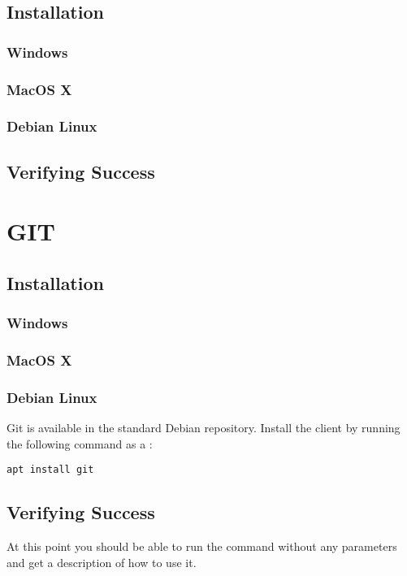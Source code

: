 \subsection{Installation}
\subsubsection{Windows}
\subsubsection{MacOS X}
\subsubsection{Debian Linux}
\subsection{Verifying Success}

\section{GIT}

\subsection{Installation}
\subsubsection{Windows}
\subsubsection{MacOS X}
\subsubsection{Debian Linux}

Git is available in the standard Debian repository. Install the client by running the following command as a :

\begin{verbatim}
apt install git
\end{verbatim}

\subsection{Verifying Success}

At this point you should be able to run the  command without any parameters and get a description of how to use it.

